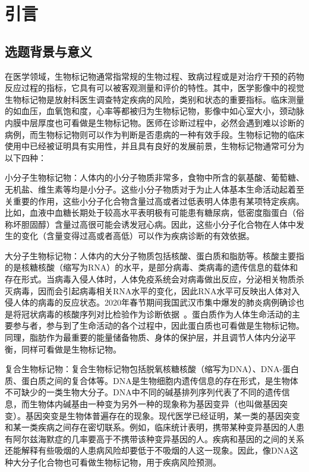 \chapter{引言}\label{cha:introduction}
\section{选题背景与意义}
\label{sec:background}
在医学领域，生物标记物通常指常规的生物过程、致病过程或是对治疗干预的药物反应过程的指标，它具有可以被客观测量和评价的特性。其中，医学影像中的视觉生物标记物是放射科医生调查特定疾病的风险，类别和状态的重要指标。临床测量的如血压，血氧饱和度，心率等都被归为生物标记物，影像中如心室大小，颈动脉内膜中层厚度也可看做是生物标记物。医师在诊断过程中，必然会遇到难以诊断的病例，而生物标记物则可以作为判断是否患病的一种有效手段。生物标记物的临床使用中已经被证明具有实用性，并且具有良好的发展前景，生物标记物通常可分为以下四种：

小分子生物标记物：人体内的小分子物质非常多，食物中所含的氨基酸、葡萄糖、无机盐、维生素等均是小分子。这些小分子物质对于为止人体基本生命活动起着至关重要的作用，这些小分子化合物含量过高或者过低表明人体患有某项特定疾病。比如，血液中血糖长期处于较高水平表明极有可能患有糖尿病，低密度脂蛋白（俗称坏胆固醇）含量过高很可能会诱发冠心病。因此，这些小分子化合物在人体中发生的变化（含量变得过高或者高低）可以作为疾病诊断的有效依据。

大分子生物标记物：人体内的大分子物质包括核酸、蛋白质和脂肪等。核酸主要指的是核糖核酸（缩写为RNA）的水平，是部分病毒、类病毒的遗传信息的载体和存在形式。当病毒入侵人体时，人体免疫系统会对病毒做出反应，分泌相关物质杀灭病毒，因而会引起病毒相关RNA水平的变化，因此RNA水平可反映出人体对入侵人体的病毒的反应状态。2020年春节期间我国武汉市集中爆发的肺炎病例确诊也是将冠状病毒的核酸序列对比检验作为诊断依据~\cite{corman2020detection}。蛋白质作为人体生命活动的主要参与者，参与到了生命活动的各个过程中，因此蛋白质也可看做是生物标记物。同理，脂肪作为最重要的能量储备物质、身体的保护层，并且调节人体内分泌平衡，同样可看做是生物标记物。

复合生物标记物：复合生物标记物包括脱氧核糖核酸（缩写为DNA）、DNA-蛋白质、蛋白质之间的复合体等。DNA是生物细胞内遗传信息的存在形式，是生物体不可缺少的一类生物大分子。DNA中不同的碱基排列序列代表了不同的遗传信息，而生物体内碱基由一种变为另外一种的现象称为基因变异（也叫做基因突变）。基因突变是生物体普遍存在的现象。现代医学已经证明，某一类的基因突变和某一类疾病之间存在密切联系。例如，临床统计表明，携带某种变异基因的人患有阿尔兹海默症的几率要高于不携带该种变异基因的人。疾病和基因的之间的关系还能解释有些吸烟的人患病风险却要低于不吸烟的人这一现象。因此，像DNA这种大分子化合物也可看做生物标记物，用于疾病风险预测。

